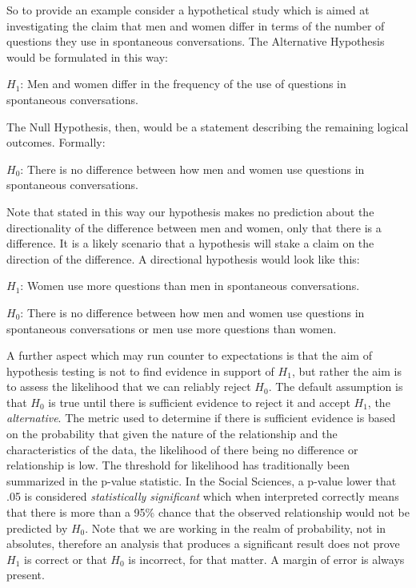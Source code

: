 \documentclass[
  letterpaper,
]{latex/krantz}
\begin{document}
So to provide an example consider a hypothetical study which is aimed at
investigating the claim that men and women differ in terms of the number
of questions they use in spontaneous conversations. The Alternative
Hypothesis would be formulated in this way:

\(H_1\): Men and women differ in the frequency of the use of questions
in spontaneous conversations.

The Null Hypothesis, then, would be a statement describing the remaining
logical outcomes. Formally:

\(H_0\): There is no difference between how men and women use questions
in spontaneous conversations.

Note that stated in this way our hypothesis makes no prediction about
the directionality of the difference between men and women, only that
there is a difference. It is a likely scenario that a hypothesis will
stake a claim on the direction of the difference. A directional
hypothesis would look like this:

\(H_1\): Women use more questions than men in spontaneous conversations.

\(H_0\): There is no difference between how men and women use questions
in spontaneous conversations or men use more questions than women.

A further aspect which may run counter to expectations is that the aim
of hypothesis testing is not to find evidence in support of \(H_1\), but
rather the aim is to assess the likelihood that we can reliably reject
\(H_0\). The default assumption is that \(H_0\) is true until there is
sufficient evidence to reject it and accept \(H_1\), the
\emph{alternative}. The metric used to determine if there is sufficient
evidence is based on the probability that given the nature of the
relationship and the characteristics of the data, the likelihood of
there being no difference or relationship is low. The threshold for
likelihood has traditionally been summarized in the p-value statistic.
In the Social Sciences, a p-value lower that .05 is considered
\emph{statistically significant} which when interpreted correctly means
that there is more than a 95\% chance that the observed relationship
would not be predicted by \(H_0\). Note that we are working in the realm
of probability, not in absolutes, therefore an analysis that produces a
significant result does not prove \(H_1\) is correct or that \(H_0\) is
incorrect, for that matter. A margin of error is always present.
\end{document}
